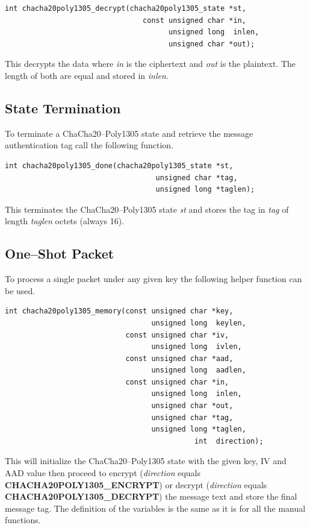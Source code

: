\documentclass[synpaper]{book}
\begin{document}
\begin{verbatim}
int chacha20poly1305_decrypt(chacha20poly1305_state *st,
                                const unsigned char *in,
                                      unsigned long  inlen,
                                      unsigned char *out);
\end{verbatim}
This decrypts the data where \textit{in} is the ciphertext and \textit{out} is the plaintext. The length of both are equal and stored in \textit{inlen}.

\subsection{State Termination}
To terminate a ChaCha20--Poly1305 state and retrieve the message authentication tag call the following function.

\begin{verbatim}
int chacha20poly1305_done(chacha20poly1305_state *st,
                                   unsigned char *tag,
                                   unsigned long *taglen);
\end{verbatim}
This terminates the ChaCha20--Poly1305 state \textit{st} and stores the tag in \textit{tag} of length \textit{taglen} octets (always 16).

\subsection{One--Shot Packet}
To process a single packet under any given key the following helper function can be used.

\begin{verbatim}
int chacha20poly1305_memory(const unsigned char *key,
                                  unsigned long  keylen,
                            const unsigned char *iv,
                                  unsigned long  ivlen,
                            const unsigned char *aad,
                                  unsigned long  aadlen,
                            const unsigned char *in,
                                  unsigned long  inlen,
                                  unsigned char *out,
                                  unsigned char *tag,
                                  unsigned long *taglen,
                                            int  direction);
\end{verbatim}
This will initialize the ChaCha20--Poly1305 state with the given key, IV and AAD value then proceed to
encrypt (\textit{direction} equals \textbf{CHACHA20POLY1305\_ENCRYPT}) or decrypt (\textit{direction} equals
\textbf{CHACHA20POLY1305\_DECRYPT}) the message text and store the final message tag. The definition of the
variables is the same as it is for all the manual functions.
\end{document}
